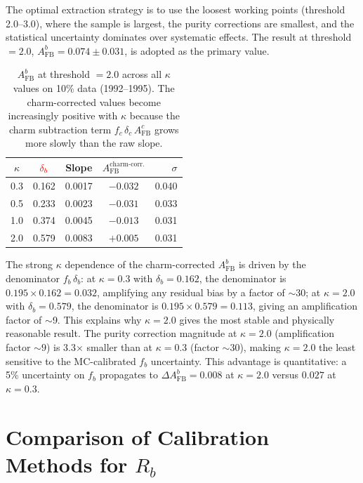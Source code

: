 \documentclass[11pt,a4paper]{article}
\newcommand{\external}[1]{\textcolor{red}{#1}}
\begin{document}
The optimal extraction strategy is to use the loosest working
points (threshold 2.0--3.0), where the sample is largest, the
purity corrections are smallest, and the statistical uncertainty
dominates over systematic effects.
The result at threshold $= 2.0$,
$A_\text{FB}^b = 0.074 \pm 0.031$, is adopted as the primary
value.

\begin{table}[htbp]
\centering
\caption{$A_\text{FB}^b$ at threshold $= 2.0$ across all $\kappa$
values on 10\% data (1992--1995). The charm-corrected values
become increasingly positive with $\kappa$ because the charm
subtraction term $f_c\,\delta_c\,A_\text{FB}^c$ grows more slowly
than the raw slope.}
\label{tbl:afb_all_kappa_thr2}
\begin{tabular}{ccccr}
\toprule
$\kappa$ & $\external{\delta_b}$ & Slope &
$A_\text{FB}^\text{charm-corr.}$ & $\sigma$ \\
\midrule
0.3 & 0.162 & 0.0017 & $-0.032$ & 0.040 \\
0.5 & 0.233 & 0.0023 & $-0.031$ & 0.033 \\
1.0 & 0.374 & 0.0045 & $-0.013$ & 0.031 \\
2.0 & 0.579 & 0.0083 & $+0.005$ & 0.031 \\
\bottomrule
\end{tabular}
\end{table}

The strong $\kappa$ dependence of the charm-corrected
$A_\text{FB}^b$ is driven by the denominator $f_b\,\delta_b$:
at $\kappa = 0.3$ with $\delta_b = 0.162$, the denominator is
$0.195 \times 0.162 = 0.032$, amplifying any residual bias by a
factor of $\sim$30; at $\kappa = 2.0$ with $\delta_b = 0.579$,
the denominator is $0.195 \times 0.579 = 0.113$, giving an
amplification factor of $\sim$9.
This explains why $\kappa = 2.0$ gives the most stable and
physically reasonable result.
The purity correction magnitude at $\kappa = 2.0$
(amplification factor $\sim 9$) is 3.3$\times$ smaller than at
$\kappa = 0.3$ (factor $\sim 30$), making $\kappa = 2.0$ the
least sensitive to the MC-calibrated $f_b$ uncertainty.
This advantage is quantitative: a 5\% uncertainty on $f_b$
propagates to $\Delta A_\text{FB}^b = 0.008$ at $\kappa = 2.0$
versus $0.027$ at $\kappa = 0.3$.

\section{Comparison of Calibration Methods for $R_b$}
\label{app:calibration_comparison}
\end{document}
